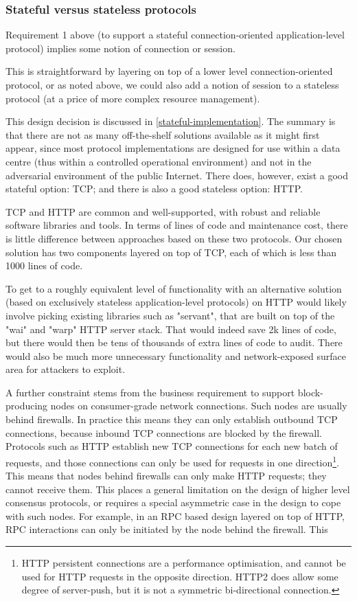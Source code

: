 \documentclass[11pt,a4paper]{article}
\begin{document}
\subsubsection{Stateful versus stateless protocols}
\label{stateful-versus-stateless-protocols}

Requirement 1 above (to support a stateful connection-oriented
application-level protocol) implies some notion of connection or
session.

This is straightforward by layering on top of a lower level
connection-oriented protocol, or as noted above, we could also add a
notion of session to a stateless protocol (at a price of more complex
resource management).

This design decision is discussed in
\cref{stateful-implementation}. The summary
is that there are not as many off-the-shelf solutions available as it
might first appear, since most protocol implementations are designed for
use within a data centre (thus within a controlled operational
environment) and not in the adversarial environment of the public
Internet. There does, however, exist a good stateful option: TCP; and
there is also a good stateless option: HTTP.

TCP and HTTP are common and well-supported, with robust and reliable
software libraries and tools. In terms of lines of code and maintenance
cost, there is little difference between approaches based on these two
protocols. Our chosen solution has two components layered on top of TCP,
each of which is less than 1000 lines of code.

To get to a roughly equivalent level of functionality with an
alternative solution (based on exclusively stateless application-level
protocols) on HTTP would likely involve picking existing libraries such
as "servant", that are built on top of the "wai" and "warp" HTTP server
stack. That would indeed save 2k lines of code, but there would then be
tens of thousands of extra lines of code to audit. There would also be
much more unnecessary functionality and network-exposed surface area for
attackers to exploit.

A further constraint stems from the business requirement to support
block-producing nodes on consumer-grade network connections. Such nodes
are usually behind firewalls. In practice this means they can only
establish outbound TCP connections, because inbound TCP connections are
blocked by the firewall. Protocols such as HTTP establish new TCP
connections for each new batch of requests, and those connections can
only be used for requests in one direction\footnote{HTTP persistent
  connections are a performance optimisation, and cannot be used for
  HTTP requests in the opposite direction. HTTP2 does allow some degree
  of server-push, but it is not a symmetric bi-directional connection.}.
This means that nodes behind firewalls can only make HTTP requests; they
cannot receive them. This places a general limitation on the design of
higher level consensus protocols, or requires a special asymmetric case
in the design to cope with such nodes. For example, in an RPC based
design layered on top of HTTP, RPC interactions can only be initiated by
the node behind the firewall. This
\end{document}
